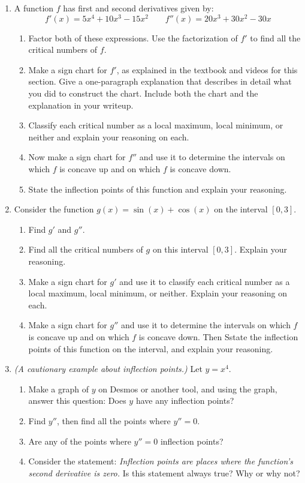 \documentclass[11pt]{article}
\begin{document}
\begin{enumerate}

\item A function $f$ has first and second derivatives given by: 
$$f'(x) =5 x^{4} + 10 x^{3} - 15 x^{2}\qquad f''(x) = 20 x^{3} + 30 x^{2} - 30 x$$
    \begin{enumerate}
        \item Factor both of these expressions. Use the factorization of $f'$ to find all the critical numbers of $f$. 
        \item Make a sign chart for $f'$, as explained in the textbook and videos for this section. Give a one-paragraph explanation that describes in detail what you did to construct the chart. Include both the chart and the explanation in your writeup. 
        \item Classify each critical number as a local maximum, local minimum, or neither and explain your reasoning on each. 
        \item Now make a sign chart for $f''$ and use it to determine the intervals on which $f$ is concave up and on which $f$ is concave down. 
        \item State the inflection points of this function and explain your reasoning. 
    \end{enumerate}
    
\item Consider the function $g(x) = \sin(x) + \cos(x)$ on the interval $[0,3]$. 
    \begin{enumerate}
        \item Find $g'$ and $g''$. 
        \item Find all the critical numbers of $g$ on this interval $[0,3]$. Explain your reasoning. 
        \item Make a sign chart for $g'$ and use it to classify each critical number as a local maximum, local minimum, or neither.  Explain your reasoning on each.  
        \item Make a sign chart for $g''$ and use it to determine the intervals on which $f$ is concave up and on which $f$ is concave down. Then Sstate the inflection points of this function on the interval, and explain your reasoning. 
    \end{enumerate}

\item \emph{(A cautionary example about inflection points.)} Let $y = x^4$. 
    \begin{enumerate}
        \item Make a graph of $y$ on Desmos or another tool, and using the graph, answer this question: Does $y$ have any inflection points? 
        \item Find $y''$, then find all the points where $y'' = 0$. 
        \item Are any of the points where $y'' = 0$ inflection points? 
        \item Consider the statement: \emph{Inflection points are places where the function's second derivative is zero.} Is this statement always true? Why or why not? 
    \end{enumerate}

\end{enumerate}
\end{document}
